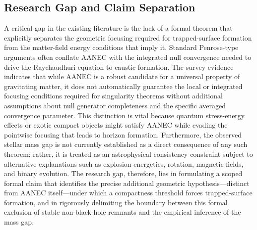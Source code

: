 \documentclass[conference]{IEEEtran}
\begin{document}
\subsection{Research Gap and Claim Separation}
A critical gap in the existing literature is the lack of a formal theorem that explicitly separates the geometric focusing required for trapped-surface formation from the matter-field energy conditions that imply it. Standard Penrose-type arguments often conflate AANEC with the integrated null convergence needed to drive the Raychaudhuri equation to caustic formation. The survey evidence indicates that while AANEC is a robust candidate for a universal property of gravitating matter, it does not automatically guarantee the local or integrated focusing conditions required for singularity theorems without additional assumptions about null generator completeness and the specific averaged convergence parameter. This distinction is vital because quantum stress-energy effects or exotic compact objects might satisfy AANEC while evading the pointwise focusing that leads to horizon formation. Furthermore, the observed stellar mass gap is not currently established as a direct consequence of any such theorem; rather, it is treated as an astrophysical consistency constraint subject to alternative explanations such as explosion energetics, rotation, magnetic fields, and binary evolution. The research gap, therefore, lies in formulating a scoped formal claim that identifies the precise additional geometric hypothesis—distinct from AANEC itself—under which a compactness threshold forces trapped-surface formation, and in rigorously delimiting the boundary between this formal exclusion of stable non-black-hole remnants and the empirical inference of the mass gap.~\cite{cite_0ed84243cf171bc4}
\end{document}
